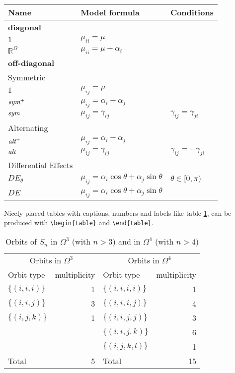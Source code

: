 \documentclass[11pt,a4paper]{article}
\newcommand{\real}{\mathbb{R}}
\newcommand{\sym}{\mbox{\em sym}}                           %
\newcommand{\alt}{\mbox{\em alt}}                           %
\newcommand{\ro}{\real^{\scriptstyle \Omega}}               %
\begin{document}
\begin{center}
{\small
\begin{tabular}{lll}
Name & Model formula & Conditions \\
\hline
\multicolumn{2}{l}{{\bf diagonal}}\\
$1$ & ${\textstyle \mu_{ii} = \mu} $\\
$\ro$ &${\textstyle \mu_{ii} = \mu + \alpha_i}$ \\
\hline
\multicolumn{2}{l}{{\bf off-diagonal}}\\
{Symmetric}\\
$1$ &${\textstyle \mu_{ij} =  \mu}$\\
$\sym^+$ &${\textstyle \mu_{ij} =  \alpha_i+\alpha_j}$\\
$\sym$& ${\textstyle \mu_{ij} =  \gamma_{ij}}$ &
${\textstyle \gamma_{ij} = \gamma_{ji}}$\\
{Alternating}\\
$\alt^+$ & ${\textstyle \mu_{ij} =  \alpha_i-\alpha_j}$\\
$\alt$ & ${\textstyle \mu_{ij} =  \gamma_{ij}}$ &
${\textstyle \gamma_{ij} = -\gamma_{ji}}$\\
{Differential Effects}\\
$DE_\theta$ & ${\textstyle \mu_{ij} =  \alpha_i \cos\theta
+\alpha_j \sin\theta}$ & ${\textstyle \theta \in [0,\pi)}$\\
$DE$ & ${\textstyle \mu_{ij} =  \alpha_i \cos\theta
+\alpha_j \sin\theta}$ & \\
\hline
\end{tabular}
}
\end{center}

Nicely placed tables with captions, numbers and labels like table \ref{tab:symgrporbits}, can be produced with \verb+\begin{table}+ and \verb+\end{table}+.


\begin{table}[tb]
\caption{Orbits of $S_n$ in $\Omega^3$ (with $n>3$)
and in $\Omega^4$ (with $n>4$)}
\label{tab:symgrporbits}
\begin{center}
\begin{tabular}{lr||lr}
\multicolumn{2}{c}{Orbits in $\Omega^3$}
&
\multicolumn{2}{c}{Orbits in $\Omega^4$} \\
Orbit type & multiplicity & Orbit type& multiplicity\\
\hline
$\{(i,i,i)\}$ & 1 & $\{(i,i,i,i)\}$ & 1 \\
$\{(i,i,j)\}$ & 3 & $\{(i,i,i,j)\}$ & 4 \\
$\{(i,j,k)\}$ & 1 & $\{(i,i,j,j)\}$ & 3 \\
&   & $\{(i,i,j,k)\}$& 6 \\
&   & $\{(i,j,k,l)\}$& 1 \\
\hline
Total        &  5 & Total        &  15
\end{tabular}
\end{center}
\end{table}
\end{document}

